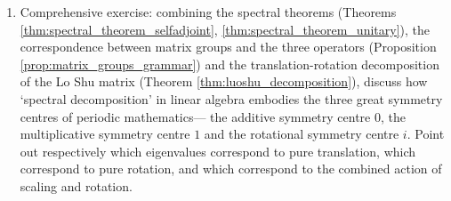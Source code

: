 \begin{enumerate}[leftmargin=3em, label=\textbf{Exercise \arabic*}]
    \item Comprehensive exercise: combining the spectral theorems (Theorems \ref{thm:spectral_theorem_selfadjoint}, \ref{thm:spectral_theorem_unitary}),
    the correspondence between matrix groups and the three operators (Proposition \ref{prop:matrix_groups_grammar})
    and the translation-rotation decomposition of the Lo Shu matrix (Theorem \ref{thm:luoshu_decomposition}),
    discuss how `spectral decomposition' in linear algebra embodies the three great symmetry centres of periodic mathematics---
    the additive symmetry centre $0$, the multiplicative symmetry centre $1$ and the rotational symmetry centre $i$.
    Point out respectively which eigenvalues correspond to pure translation, which correspond to pure rotation, and which correspond to the combined action of scaling and rotation.
\end{enumerate}

